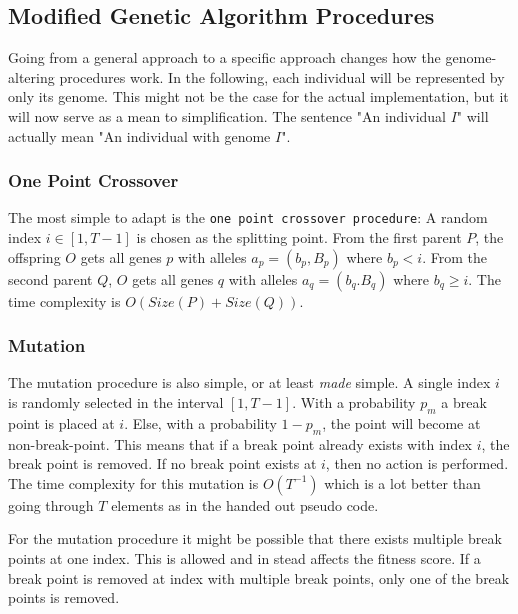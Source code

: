 
\subsection{Modified Genetic Algorithm Procedures} \label{sec:modified-procedures}

Going from a general approach to a specific approach changes how the
genome-altering procedures work. In the following, each individual will be
represented by only its genome. This
might not be the case for the actual implementation, but it will now serve as a
mean to simplification. The sentence "An individual $I$" will actually mean "An
individual with genome $I$". 

\subsubsection{One Point Crossover} \label{sec:one-point-crossover}

The most simple to adapt is the \texttt{one point crossover procedure}: A random
index $i \in [1, T-1]$ is chosen as the splitting point. From the first parent
$P$, the offspring $O$ gets all genes $p$ with alleles $a_p = (b_p, B_p)$ where
$b_p < i$. From the second parent $Q$, $O$ gets all genes $q$ with alleles $a_q
= (b_q. B_q)$ where $b_q \geq i$. The time complexity is $O(Size(P) + Size(Q))$.

\subsubsection{Mutation} \label{sec:mutation}

The mutation procedure is also simple, or at least \textit{made} simple. A single
index $i$ is randomly selected in the interval $[1, T - 1]$. With a probability
$p_m$ a break point is placed at $i$. Else, with a probability $1 - p_m$, the point will become at
non-break-point. This means that if a break point already exists with index $i$,
the break point is removed. If no break point exists at $i$, then no action is
performed. The time complexity for this mutation is $O(T^{-1})$ which is a lot
better than going through $T$ elements as in the handed out pseudo code. 

For the mutation procedure it might be possible that there exists multiple break
points at one index. This is allowed and in stead affects the fitness score. If
a break point is removed at index with multiple break points, only one of the
break points is removed. 

